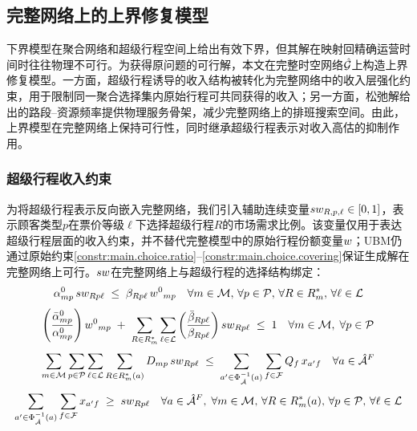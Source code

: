 \subsection{完整网络上的上界修复模型}
\label{sec:ub}

下界模型在聚合网络和超级行程空间上给出有效下界，但其解在映射回精确运营时间时往往物理不可行。为获得原问题的可行解，本文在完整时空网络$\full{\net}$上构造上界修复模型。一方面，超级行程诱导的收入结构被转化为完整网络中的收入层强化约束，用于限制同一聚合选择集内原始行程可共同获得的收入；另一方面，松弛解给出的路段--资源频率提供物理服务骨架，减少完整网络上的排班搜索空间。由此，上界模型在完整网络上保持可行性，同时继承超级行程表示对收入高估的抑制作用。

\subsubsection*{超级行程收入约束}

为将超级行程表示反向嵌入完整网络，我们引入辅助连续变量$sw_{R,p,\ell} \in [0, 1]$，表示顾客类型$p$在票价等级$\ell$下选择超级行程$R$的市场需求比例。该变量仅用于表达超级行程层面的收入约束，并不替代完整模型中的原始行程份额变量$w$；UBM仍通过原始约束\eqref{constr:main.choice.ratio}--\eqref{constr:main.choice.covering}保证生成解在完整网络上可行。$sw$在完整网络上与超级行程的选择结构绑定：
\begin{equation}
    \alpha^0_{mp}\, sw_{Rp\ell} \;\le\; \beta_{Rp\ell}\, {w^0}_{mp}
    \quad \forall m\in \mathcal{M},\, \forall p\in \mathcal{P},\, \forall R\in R^{*}_{m},\, \forall \ell\in \mathcal{L}
    \label{constr:ubm.itinerary_cut.choice.ratio}
\end{equation}
\begin{equation}
    \left(\frac{\bar{\alpha}^0_{mp}}{\alpha^0_{mp}}\right) {w^0}_{mp}
    \;+\;
    \sum_{R\in R^{*}_{m}}\sum_{\ell\in \mathcal{L}} 
    \left(\frac{\bar{\beta}_{Rp\ell}}{\beta_{Rp\ell}}\right) sw_{Rp\ell}
    \;\le\; 1
    \quad \forall m\in \mathcal{M},\; \forall p\in \mathcal{P}
    \label{constr:ubm.itinerary_cut.choice.limit}
\end{equation}
\begin{equation}
    \sum_{m\in \mathcal{M}}\sum_{p\in \mathcal{P}}\sum_{\ell\in \mathcal{L}}\sum_{R\in R^{*}_{m}(a)} 
    D_{mp}\, sw_{Rp\ell}\;\le\; \sum_{a'\in \Phi_{\hat{\mathcal{A}}}^{-1}(a)}\sum_{f\in \mathcal{F}} Q_{f}\, x_{a'f}
    \quad \forall a\in {\hat{\mathcal{A}}^F_{{}}}
    \label{constr:ubm.itinerary_cut.choice.capacity}
\end{equation}
\begin{equation}
    \sum_{a'\in \Phi_{\hat{\mathcal{A}}}^{-1}(a)}\sum_{f\in \mathcal{F}} x_{a'f} \;\ge\; sw_{Rp\ell}
    \quad \forall a\in {\hat{\mathcal{A}}^F_{{}}},\; \forall m\in \mathcal{M},\, \forall R\in R^{*}_{m}(a),\, \forall p\in \mathcal{P},\,\forall \ell\in\mathcal{L}
    \label{constr:ubm.itinerary_cut.choice.covering}
\end{equation}

